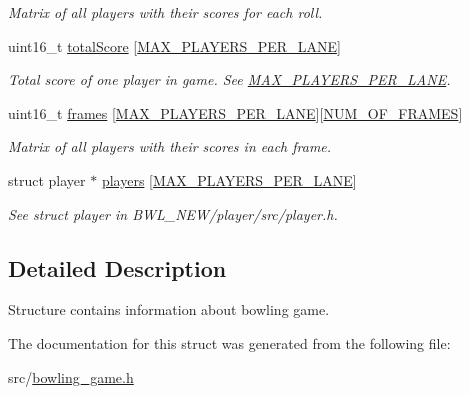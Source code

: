 \begin{DoxyCompactItemize}
\begin{DoxyCompactList}\small\item\em Matrix of all players with their scores for each roll. \end{DoxyCompactList}\item 
\hypertarget{structbowling__game_ab427df0f197e7bb61bef2725bf73a07b}{uint16\-\_\-t \hyperlink{structbowling__game_ab427df0f197e7bb61bef2725bf73a07b}{total\-Score} \mbox{[}\hyperlink{bowling__game_8h_a06fc87d81c62e9abb8790b6e5713c55bad9d4e23298ae8d4d51209ba1f4b041ad}{M\-A\-X\-\_\-\-P\-L\-A\-Y\-E\-R\-S\-\_\-\-P\-E\-R\-\_\-\-L\-A\-N\-E}\mbox{]}}\label{structbowling__game_ab427df0f197e7bb61bef2725bf73a07b}

\begin{DoxyCompactList}\small\item\em Total score of one player in game. See \hyperlink{bowling__game_8h_a06fc87d81c62e9abb8790b6e5713c55bad9d4e23298ae8d4d51209ba1f4b041ad}{M\-A\-X\-\_\-\-P\-L\-A\-Y\-E\-R\-S\-\_\-\-P\-E\-R\-\_\-\-L\-A\-N\-E}. \end{DoxyCompactList}\item 
\hypertarget{structbowling__game_a7f951618d5966d1b0eb746cb754e9a38}{uint16\-\_\-t \hyperlink{structbowling__game_a7f951618d5966d1b0eb746cb754e9a38}{frames} \mbox{[}\hyperlink{bowling__game_8h_a06fc87d81c62e9abb8790b6e5713c55bad9d4e23298ae8d4d51209ba1f4b041ad}{M\-A\-X\-\_\-\-P\-L\-A\-Y\-E\-R\-S\-\_\-\-P\-E\-R\-\_\-\-L\-A\-N\-E}\mbox{]}\mbox{[}\hyperlink{bowling__game_8h_a06fc87d81c62e9abb8790b6e5713c55ba02a6463b7b0ad6c54fe9fb086ff0a309}{N\-U\-M\-\_\-\-O\-F\-\_\-\-F\-R\-A\-M\-E\-S}\mbox{]}}\label{structbowling__game_a7f951618d5966d1b0eb746cb754e9a38}

\begin{DoxyCompactList}\small\item\em Matrix of all players with their scores in each frame. \end{DoxyCompactList}\item 
\hypertarget{structbowling__game_a8e9ad15ed2846b4a757c8eda72be4d36}{struct player $\ast$ \hyperlink{structbowling__game_a8e9ad15ed2846b4a757c8eda72be4d36}{players} \mbox{[}\hyperlink{bowling__game_8h_a06fc87d81c62e9abb8790b6e5713c55bad9d4e23298ae8d4d51209ba1f4b041ad}{M\-A\-X\-\_\-\-P\-L\-A\-Y\-E\-R\-S\-\_\-\-P\-E\-R\-\_\-\-L\-A\-N\-E}\mbox{]}}\label{structbowling__game_a8e9ad15ed2846b4a757c8eda72be4d36}

\begin{DoxyCompactList}\small\item\em See struct player in B\-W\-L\-\_\-\-N\-E\-W/player/src/player.\-h. \end{DoxyCompactList}\end{DoxyCompactItemize}


\subsection{Detailed Description}
Structure contains information about bowling game. 

The documentation for this struct was generated from the following file\-:\begin{DoxyCompactItemize}
\item 
src/\hyperlink{bowling__game_8h}{bowling\-\_\-game.\-h}\end{DoxyCompactItemize}
